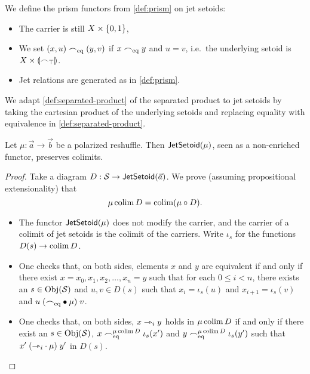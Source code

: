 \documentclass[a4paper]{memoir}
\begin{document}
\begin{definition} \label{def:jetsetoid-prism}
	We define the prism functors from \cref{def:prism} on jet setoids:
	\begin{itemize}
		\item The carrier is still $X \times \mathopen{}\left\{ 0, 1 \right\}\mathclose{}$,
		\item We set $(x, u) \frown_{{\mathrm{eq}}} (y, v)$ if $x \frown_{{\mathrm{eq}}} y$ and $u = v$, i.e.\ the underlying setoid is $X \times {\llparenthesis {\frown}_\top\rrparenthesis}$.
		\item Jet relations are generated as in \cref{def:prism}.
	\end{itemize}
\end{definition}
\begin{definition} \label{def:jetsetoid-separated-product}
	We adapt \cref{def:separated-product} of the separated product to jet setoids by taking the cartesian product of the underlying setoids and replacing equality with equivalence in \cref{def:separated-product}.
\end{definition}
\begin{lemma} \label{thm:poresh-jetsetoid-cocontinuous}
	Let $\mu : \vec a \to \vec b$ be a polarized reshuffle.
	Then $\mathsf{JetSetoid}(\mu)$, seen as a non-enriched functor, preserves colimits.
\end{lemma}
\begin{proof}
	Take a diagram $D : \mathcal{S} \to \mathsf{JetSetoid}(\vec a)$.
	We prove (assuming propositional extensionality) that
	\[
		\mu \operatorname*{colim} D = \operatorname*{colim} (\mu  \circ D).
	\]
	\begin{itemize}
		\item The functor $\mathsf{JetSetoid}(\mu)$ does not modify the carrier, and the carrier of a colimit of jet setoids is the colimit of the carriers.
		Write $\iota_s$ for the functions $D(s) \to \operatorname*{colim} D$.
		\item One checks that, on both sides, elements $x$ and $y$ are equivalent if and only if there exist $x = x_0, x_1, x_2, \ldots, x_n = y$ such that for each $0 \leq i < n$, there exists an $s \in \mathrm{Obj}(\mathcal{S})$ and $u, v \in D(s)$ such that $x_i = \iota_s(u)$ and $x_{i+1} = \iota_s(v)$ and $u \mathrel{({\frown}_{{\mathrm{eq}}} \mathbin{\bullet} \mu)} v$.
		\item One checks that, on both sides, $x \rightarrowtriangle_i y$ holds in $\mu \operatorname*{colim} D$ if and only if there exist an $s \in \mathrm{Obj}(\mathcal{S})$, $x \frown_{{\mathrm{eq}}}^{\mu \operatorname*{colim} D} \iota_s(x')$ and $y \frown_{{\mathrm{eq}}}^{\mu \operatorname*{colim} D} \iota_s(y')$ such that $x' \mathrel{({\rightarrowtriangle}_i \cdot \mu)} y'$ in $D(s)$. \qedhere
	\end{itemize}
\end{proof}
\end{document}
